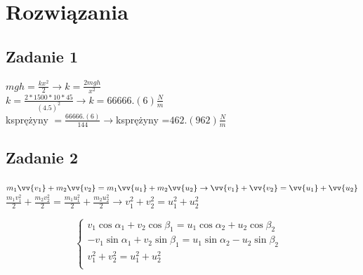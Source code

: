 \documentclass[14pt]{extarticle}
\begin{document}
    \section{Rozwiązania}
    \subsection{Zadanie 1}
    \Large
        \(mgh=\frac{kx^2}{2} \rightarrow k=\frac{2mgh}{x^2}\)\\
        \(k=\frac{2\ast 1500 \ast 10\ast 45}{(4.5)^2} \rightarrow k=66666.(6)\frac{N}{m}\)\\
        k\footnotesize sprężyny \Large\(=\frac{66666.(6)}{144} \rightarrow\)k\footnotesize sprężyny \LARGE=\underline{\(462.(962)\frac{N}{m}\)}
    \subsection{Zadanie 2}
    \large
    $m_1\vv{v_1}+m_2\vv{v_2}=m_1\vv{u_1}+m_2\vv{u_2} \rightarrow \vv{v_1} + \vv{v_2} = \vv{u_1} + \vv{u_2}$\\
    $\frac{m_1v_1^2}{2}+\frac{m_2v_2^2}{2}=\frac{m_1u_1^2}{2}+\frac{m_2u_2^2}{2} \rightarrow v_1^2 + v_2^2 = u_1^2 + u_2^2 $
    
    \begin{equation}
        \begin{cases}
           v_1\cos\alpha _1 + v_2\cos\beta _1 = u_1\cos\alpha _2 + u_2\cos\beta _2 &\\
            -v_1\sin\alpha _1 + v_2\sin\beta _1 = u_1\sin\alpha _2 - u_2\sin\beta _2 &\\
           v_1^2 + v_2^2 = u_1^2 + u_2^2 &\\
        \end{cases}
    \end{equation}
        
            
\end{document}
